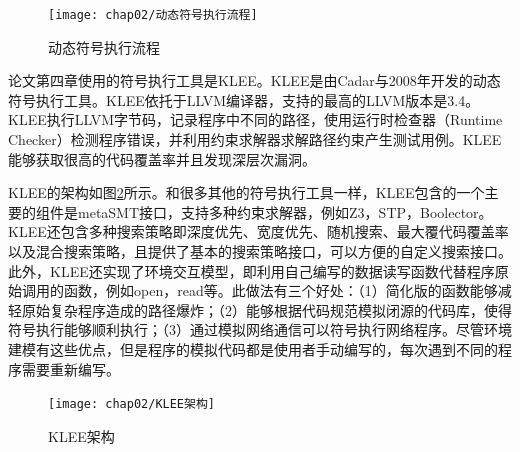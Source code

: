 \begin{figure}[h]
\begin{center}
\texttt{[image: chap02/动态符号执行流程]}
\end{center}
\caption{动态符号执行流程}
\label{动态符号执行流程}
\end{figure}

论文第四章使用的符号执行工具是KLEE。KLEE是由Cadar与2008年开发的动态符号执行工具。KLEE依托于LLVM编译器，支持的最高的LLVM版本是3.4。KLEE执行LLVM字节码，记录程序中不同的路径，使用运行时检查器（Runtime Checker）检测程序错误，并利用约束求解器求解路径约束产生测试用例。KLEE能够获取很高的代码覆盖率并且发现深层次漏洞。

KLEE的架构如图\ref{KLEE架构}所示。和很多其他的符号执行工具一样，KLEE包含的一个主要的组件是metaSMT接口，支持多种约束求解器，例如Z3，STP，Boolector。KLEE还包含多种搜索策略即深度优先、宽度优先、随机搜索、最大覆代码覆盖率以及混合搜索策略，且提供了基本的搜索策略接口，可以方便的自定义搜索接口。此外，KLEE还实现了环境交互模型，即利用自己编写的数据读写函数代替程序原始调用的函数，例如open，read等。此做法有三个好处：（1）简化版的函数能够减轻原始复杂程序造成的路径爆炸；（2）能够根据代码规范模拟闭源的代码库，使得符号执行能够顺利执行；（3）通过模拟网络通信可以符号执行网络程序。尽管环境建模有这些优点，但是程序的模拟代码都是使用者手动编写的，每次遇到不同的程序需要重新编写。

\begin{figure}[h]
\begin{center}
\texttt{[image: chap02/KLEE架构]}
\end{center}
\caption{KLEE架构}
\label{KLEE架构}
\end{figure}



